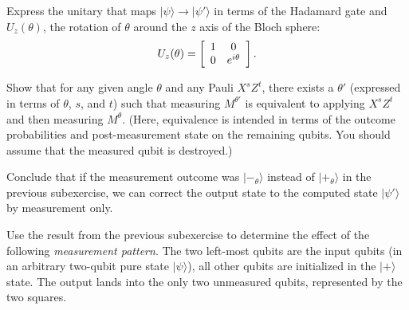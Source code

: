 \documentclass[a4paper,10pt,landscape,twocolumn]{scrartcl}
\newcommand{\ket}[1]{\lvert #1 \rangle}
\begin{document}
\begin{exercise}
\begin{subex}
		Express the unitary that maps $\ket{\psi} \to \ket{\psi'}$ in terms of the Hadamard gate and $U_z(\theta)$, the rotation of $\theta$ around the $z$ axis of the Bloch sphere:
		\[
		U_z(\theta) = \left[\begin{array}{c c}
		1&0\\
		0&e^{i\theta}
		\end{array}\right].
		\]
	\end{subex}
	\begin{subex}
		Show that for any given angle $\theta$ and any Pauli $X^sZ^t$, there exists a $\theta'$ (expressed in terms of $\theta$, $s$, and $t$) such that measuring $M^{\theta'}$ is equivalent to applying $X^sZ^t$ and then measuring $M^{\theta}$. (Here, equivalence is intended in terms of the outcome probabilities and post-measurement state on the remaining qubits. You should assume that the measured qubit is destroyed.)
		
		Conclude that if the measurement outcome was $\ket{-_{\theta}}$ instead of $\ket{+_\theta}$ in the previous subexercise, we can correct the output state to the computed state $\ket{\psi'}$ by measurement only.
	\end{subex}
	\begin{subex}
		Use the result from the previous subexercise to determine the effect of the following \emph{measurement pattern}. The two left-most qubits are the input qubits (in an arbitrary two-qubit pure state $\ket{\psi}$), all other qubits are initialized in the $\ket{+}$ state. The output lands into the only two unmeasured qubits, represented by the two squares.
		

\end{subex}
\end{exercise}
\end{document}
